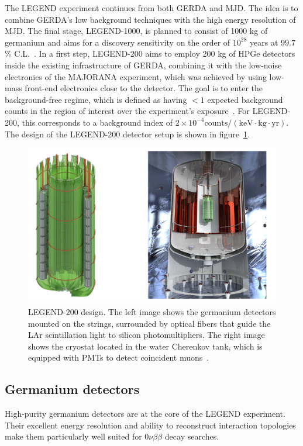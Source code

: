 The LEGEND experiment continues from both GERDA and MJD. The idea is to combine GERDA's low background techniques with the high energy resolution of MJD. The final stage, LEGEND-1000, is planned to consist of 1000 kg of germanium and aims for a discovery sensitivity on the order of $10^{28}$ years at $99.7$\% C.L.~\cite{abgrall_large_2017}. 
In a first step, LEGEND-200 aims to employ 200 kg of HPGe detectors inside the existing infrastructure of GERDA, combining it with the low-noise electronics of the MAJORANA experiment, which was achieved by using low-mass front-end electronics close to the detector. The goal is to enter the background-free regime, which is defined as having $< 1$ expected background counts in the region of interest over the experiment's exposure~\cite{collaboration_legend-1000_2021}. For LEGEND-200, this corresponds to a background index of $2 \times 10^{-4} \mathrm{counts / (keV \cdot kg \cdot yr)}$. The design of the LEGEND-200 detector setup is shown in figure~\ref{fig:l200_design}. 

\begin{figure}
    \centering
    \includegraphics[width=0.8\linewidth]{figures/03_legend/LEGEND_200_design.png}
    \caption{LEGEND-200 design. The left image shows the germanium detectors mounted on the strings, surrounded by optical fibers that guide the LAr scintillation light to silicon photomultipliers. 
	The right image shows the cryostat located in the water Cherenkov tank, which is equipped with PMTs to detect coincident muons~\cite{collaboration_legend-1000_2021}.}
    \label{fig:l200_design}
\end{figure}


\subsection{Germanium detectors}
High-purity germanium detectors are at the core of the LEGEND experiment. Their excellent energy resolution and ability to reconstruct interaction topologies make them particularly well suited for $0 \nu \beta \beta$ decay searches. 

